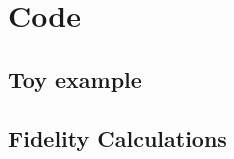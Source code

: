 \documentclass[11pt, oneside, listof=totoc]{scrbook}
\begin{document}


\chapter{Code}\label{appendix:code}

\section{Toy example}






\section{Fidelity Calculations}


\backmatter
\printbibliography[heading=bibintoc, title=Bibliography]
\end{document}
